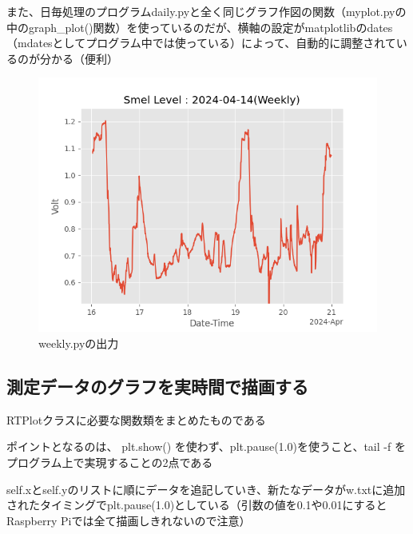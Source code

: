 \documentclass[12pt,a4paper,uplatex]{jsarticle}
\begin{document}
また、日毎処理のプログラムdaily.pyと全く同じグラフ作図の関数（myplot.pyの中のgraph\_plot()関数）を使っているのだが、横軸の設定がmatplotlibのdates（mdatesとしてプログラム中では使っている）によって、自動的に調整されているのが分かる（便利）

\begin{figure}[htbp]
	\begin{minipage}[b]{1.0\linewidth}
		\centering
		\includegraphics[keepaspectratio, scale=0.8]{figs/png/Weekly_2024-04-14.png}
		\caption{weekly.pyの出力}
	\end{minipage}
\end{figure}


\subsection{測定データのグラフを実時間で描画する}

	RTPlotクラスに必要な関数類をまとめたものである
	
	ポイントとなるのは、 plt.show() を使わず、plt.pause(1.0)を使うこと、tail -f をプログラム上で実現することの2点である
	
	self.xとself.yのリストに順にデータを追記していき、新たなデータがw.txtに追加されたタイミングでplt.pause(1.0)としている（引数の値を0.1や0.01にするとRaspberry Piでは全て描画しきれないので注意）
	
\end{document}
